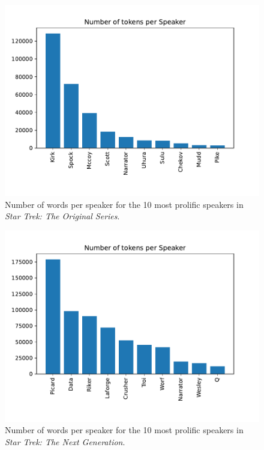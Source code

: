 \begin{figure}
  \centering
  \includegraphics[width=\columnwidth]{figures/localized/tos_group_sizes.pdf}
  \caption{Number of words per speaker for the 10 most prolific speakers in \textit{Star Trek: The Original Series}.}
  \label{fig:tos_group_sizes}
\end{figure}

\begin{figure}
  \centering
  \includegraphics[width=\columnwidth]{figures/localized/tng_group_sizes.pdf}
  \caption{Number of words per speaker for the 10 most prolific speakers in \textit{Star Trek: The Next Generation}.}
  \label{fig:tng_group_sizes}
\end{figure}

